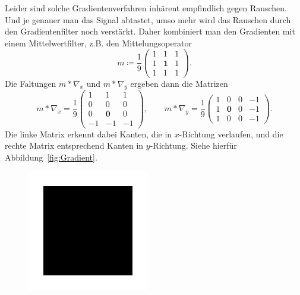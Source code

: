 \begin{example}
\begin{description}
  Leider sind solche Gradientenverfahren inhärent empfindlich gegen Rauschen. Und je genauer man 
  das Signal abtastet, umso mehr wird das Rauschen durch den Gradientenfilter noch verstärkt. Daher
  kombiniert man den Gradienten mit einem Mittelwertfilter, z.B. den Mittelungsoperator
  \[
    m \coloneqq
    \frac{1}{9} \begin{pmatrix}
      1 & 1 & 1 \\
      1 & \mathbf{1} & 1 \\
      1 & 1 & 1
    \end{pmatrix}.
  \]
  Die Faltungen $ m * \nabla_{x} $ und $ m * \nabla_{y} $ ergeben dann die Matrizen
  \[
      m * \nabla_{x}
    = \frac{1}{9} \begin{pmatrix}
        1 & 1 & 1 \\
        0 & 0 & 0 \\
        0 & \mathbf{0} & 0 \\
        -1 & -1 & -1
      \end{pmatrix}, \qquad
      m * \nabla_{y}
    = \frac{1}{9} \begin{pmatrix}
        1 & 0 & 0 & -1 \\
        1 & \mathbf{0} & 0 & -1 \\
        1 & 0 & 0 & -1
      \end{pmatrix}.
  \]
  Die linke Matrix erkennt dabei Kanten, die in $ x $-Richtung verlaufen, und die rechte Matrix
  entsprechend Kanten in $ y $-Richtung. Siehe hierfür Abbildung~\ref{fig:Gradient}.
  \begin{figure}[ht]
  \centering
    \begin{minipage}{0.3\textwidth}
    \includegraphics[width=\textwidth]{Bilder/Gradient}

\end{minipage}
\end{figure}
\end{description}
\end{example}
